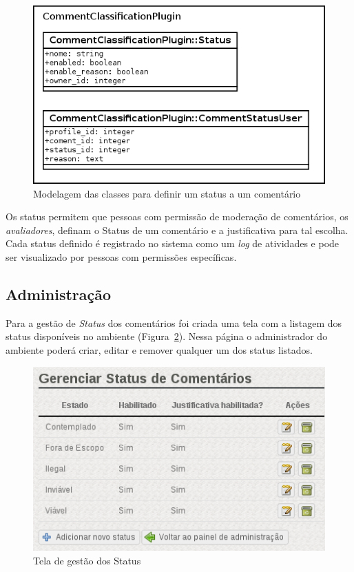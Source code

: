 \documentclass[11pt]{article}
\begin{document}
\begin{figure}[h]
\center
\includegraphics[scale=0.5]{status-model.png}
\caption{Modelagem das classes para definir um status a um comentário}
\label{fig:status-model}
\end{figure}

Os status permitem que pessoas com permissão de moderação de
comentários, os {\it avaliadores}, definam o Status de um comentário e a
justificativa para tal escolha. Cada status definido é registrado no
sistema como um {\it log} de atividades e pode ser visualizado por
pessoas com permissões específicas.

\subsection{Administração}

Para a gestão de {\it Status} dos comentários foi criada uma tela com
a listagem dos status disponíveis no ambiente
(Figura~\ref{fig:plugin-status-admin}). Nessa página o administrador
do ambiente poderá criar, editar e remover qualquer um dos status
listados.

\begin{figure}[h]
\center
\includegraphics[scale=0.5]{plugin-status-admin.png}
\caption{Tela de gestão dos Status}
\label{fig:plugin-status-admin}
\end{figure}
\end{document}

